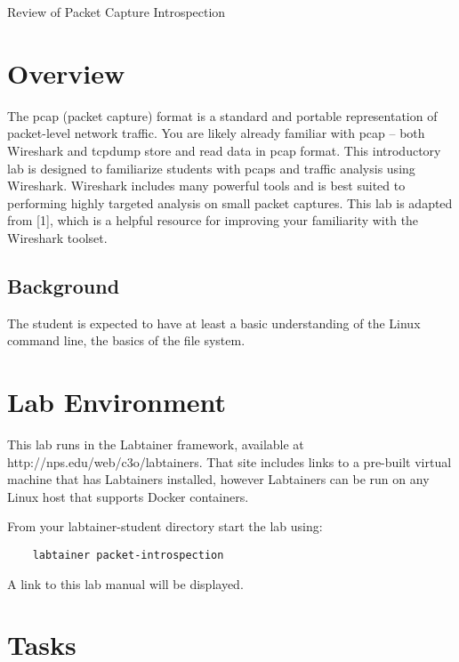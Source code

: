 


\begin{center}
{\LARGE Review of Packet Capture Introspection}
\vspace{0.1in}\\
\end{center}

\section{Overview}
The pcap (packet capture) format is a standard and portable representation of packet-level
network traffic. You are likely already familiar with pcap – both Wireshark and tcpdump
store and read data in pcap format.
This introductory lab is designed to familiarize students with pcaps and traffic analysis
using Wireshark. Wireshark includes many powerful tools and is best suited to performing
highly targeted analysis on small packet captures. This lab is adapted from [1], which is a
helpful resource for improving your familiarity with the Wireshark toolset.

\subsection {Background}
The student is expected to have at least a basic understanding of the Linux command line,
the basics of the file system.

\section{Lab Environment}
This lab runs in the Labtainer framework,
available at http://nps.edu/web/c3o/labtainers.
That site includes links to a pre-built virtual machine
that has Labtainers installed, however Labtainers can
be run on any Linux host that supports Docker containers.

From your labtainer-student directory start the lab using:
\begin{verbatim}
    labtainer packet-introspection
\end{verbatim}
\noindent A link to this lab manual will be displayed.  

\section {Tasks}
